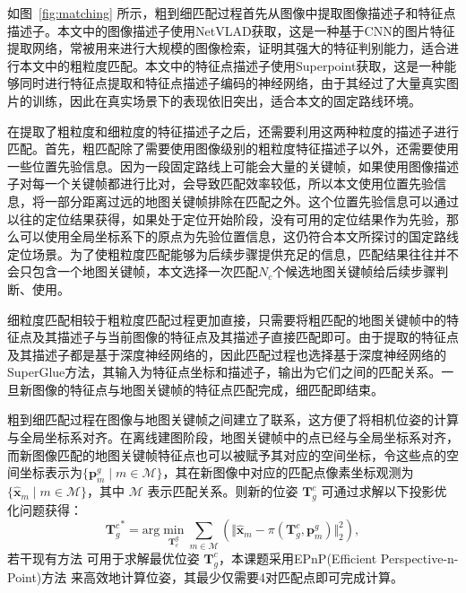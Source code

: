 如图~\ref{fig:matching} 所示，粗到细匹配过程首先从图像中提取图像描述子和特征点描述子。本文中的图像描述子使用NetVLAD\cite{arandjelovic2016netvlad}获取，这是一种基于CNN的图片特征提取网络，常被用来进行大规模的图像检索，证明其强大的特征判别能力，适合进行本文中的粗粒度匹配。本文中的特征点描述子使用Superpoint\cite{detone2018superpoint}获取，这是一种能够同时进行特征点提取和特征点描述子编码的神经网络，由于其经过了大量真实图片的训练，因此在真实场景下的表现依旧突出，适合本文的固定路线环境。

在提取了粗粒度和细粒度的特征描述子之后，还需要利用这两种粒度的描述子进行匹配。首先，粗匹配除了需要使用图像级别的粗粒度特征描述子以外，还需要使用一些位置先验信息。因为一段固定路线上可能会大量的关键帧，如果使用图像描述子对每一个关键帧都进行比对，会导致匹配效率较低，所以本文使用位置先验信息，将一部分距离过远的地图关键帧排除在匹配之外。这个位置先验信息可以通过以往的定位结果获得，如果处于定位开始阶段，没有可用的定位结果作为先验，那么可以使用全局坐标系下的原点为先验位置信息，这仍符合本文所探讨的国定路线定位场景。为了使粗粒度匹配能够为后续步骤提供充足的信息，匹配结果往往并不会只包含一个地图关键帧，本文选择一次匹配$N_c$个候选地图关键帧给后续步骤判断、使用。

细粒度匹配相较于粗粒度匹配过程更加直接，只需要将粗匹配的地图关键帧中的特征点及其描述子与当前图像的特征点及其描述子直接匹配即可。由于提取的特征点及其描述子都是基于深度神经网络的，因此匹配过程也选择基于深度神经网络的SuperGlue\cite{sarlin2020superglue}方法，其输入为特征点坐标和描述子，输出为它们之间的匹配关系。一旦新图像的特征点与地图关键帧的特征点匹配完成，细匹配即结束。

粗到细匹配过程在图像与地图关键帧之间建立了联系，这方便了将相机位姿的计算与全局坐标系对齐。在离线建图阶段，地图关键帧中的点已经与全局坐标系对齐，而新图像匹配的地图关键帧特征点也可以被赋予其对应的空间坐标，令这些点的空间坐标表示为$\{\symbf{p}_m^g \mid m \in \mathcal{M}\}$，其在新图像中对应的匹配点像素坐标观测为$\{\hat{\symbf{x}}_m \mid m \in \mathcal{M}\}$，其中 $\mathcal{M}$ 表示匹配关系。则新的位姿 $\symbf{T}^{c}_g$ 可通过求解以下投影优化问题获得：
\begin{equation}
  {\symbf{T}^{c}_g}^* = \text{arg} \min_{\symbf{T}_{c}^g} \sum_{m \in \mathcal{M}} \left( \Vert \hat{\symbf{x}}_m - \pi(\symbf{T}^{c}_g, \symbf{p}_m^g) \Vert^2_2 \right),
\end{equation}
若干现有方法 \cite{lepetit2009ep, gao2003complete} 可用于求解最优位姿 $\symbf{T}^{c}_g$，本课题采用EPnP(Efficient Perspective-n-Point)方法 \cite{lepetit2009ep}来高效地计算位姿，其最少仅需要4对匹配点即可完成计算。

